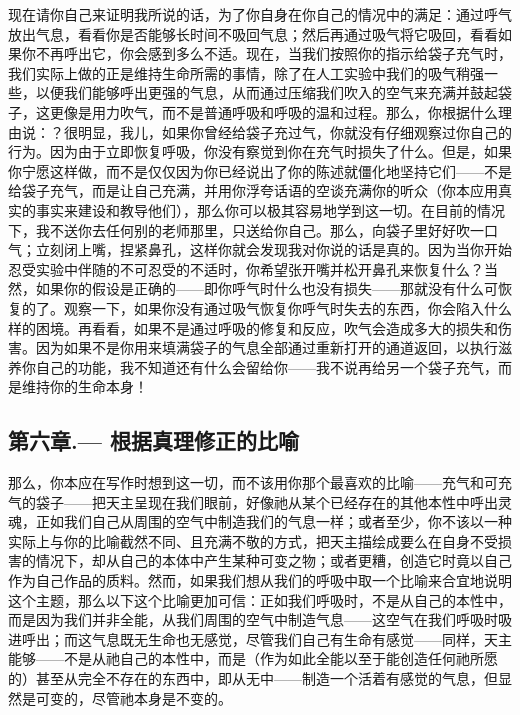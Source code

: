 现在请你自己来证明我所说的话，为了你自身在你自己的情况中的满足：通过呼气放出气息，看看你是否能够长时间不吸回气息；然后再通过吸气将它吸回，看看如果你不再呼出它，你会感到多么不适。现在，当我们按照你的指示给袋子充气时，我们实际上做的正是维持生命所需的事情，除了在人工实验中我们的吸气稍强一些，以便我们能够呼出更强的气息，从而通过压缩我们吹入的空气来充满并鼓起袋子，这更像是用力吹气，而不是普通呼吸和呼吸的温和过程。那么，你根据什么理由说：？很明显，我儿，如果你曾经给袋子充过气，你就没有仔细观察过你自己的行为。因为由于立即恢复呼吸，你没有察觉到你在充气时损失了什么。但是，如果你宁愿这样做，而不是仅仅因为你已经说出了你的陈述就僵化地坚持它们——不是给袋子充气，而是让自己充满，并用你浮夸话语的空谈充满你的听众（你本应用真实的事实来建设和教导他们），那么你可以极其容易地学到这一切。在目前的情况下，我不送你去任何别的老师那里，只送给你自己。那么，向袋子里好好吹一口气；立刻闭上嘴，捏紧鼻孔，这样你就会发现我对你说的话是真的。因为当你开始忍受实验中伴随的不可忍受的不适时，你希望张开嘴并松开鼻孔来恢复什么？当然，如果你的假设是正确的——即你呼气时什么也没有损失——那就没有什么可恢复的了。观察一下，如果你没有通过吸气恢复你呼气时失去的东西，你会陷入什么样的困境。再看看，如果不是通过呼吸的修复和反应，吹气会造成多大的损失和伤害。因为如果不是你用来填满袋子的气息全部通过重新打开的通道返回，以执行滋养你自己的功能，我不知道还有什么会留给你——我不说再给另一个袋子充气，而是维持你的生命本身！\par


\subsection{第六章.— 根据真理修正的比喻}

那么，你本应在写作时想到这一切，而不该用你那个最喜欢的比喻——充气和可充气的袋子——把天主呈现在我们眼前，好像祂从某个已经存在的其他本性中呼出灵魂，正如我们自己从周围的空气中制造我们的气息一样；或者至少，你不该以一种实际上与你的比喻截然不同、且充满不敬的方式，把天主描绘成要么在自身不受损害的情况下，却从自己的本体中产生某种可变之物；或者更糟，创造它时竟以自己作为自己作品的质料。然而，如果我们想从我们的呼吸中取一个比喻来合宜地说明这个主题，那么以下这个比喻更加可信：正如我们呼吸时，不是从自己的本性中，而是因为我们并非全能，从我们周围的空气中制造气息——这空气在我们呼吸时吸进呼出；而这气息既无生命也无感觉，尽管我们自己有生命有感觉——同样，天主能够——不是从祂自己的本性中，而是（作为如此全能以至于能创造任何祂所愿的）甚至从完全不存在的东西中，即从无中——制造一个活着有感觉的气息，但显然是可变的，尽管祂本身是不变的。\par

